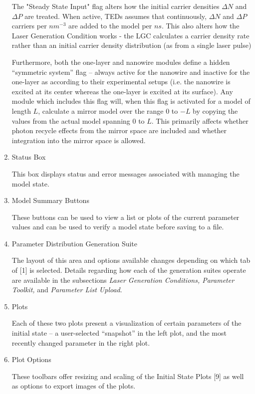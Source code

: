 \documentclass[11pt,letterpaper,titlepage]{article}
\begin{document}
\begin{enumerate}
				\par The "Steady State Input" flag alters how the initial carrier densities $\Delta N$ and $\Delta P$ are treated. When active, TEDs assumes that continuously, $\Delta N$ and $\Delta P$ carriers per $ nm^{-3}$ are added to the model per $ ns $. This also alters how the Laser Generation Condition works - the LGC calculates a carrier density rate rather than an initial carrier density distribution (as from a single laser pulse)
				
				\par Furthermore, both the one-layer and nanowire modules define a hidden “symmetric system” flag – always active for the nanowire and inactive for the one-layer as according to their experimental setups (i.e. the nanowire is excited at its center whereas the one-layer is excited at its surface). Any module which includes this flag will, when this flag is activated for a model of length $L$, calculate a mirror model over the range 0 to $-L$ by copying the values from the actual model spanning 0 to $L$. This primarily affects whether photon recycle effects from the mirror space are included and whether integration into the mirror space is allowed.
				
				\item Status Box
				\par
				This box displays status and error messages associated with managing the model state.
				
				\item Model Summary Buttons
				\par These buttons can be used to view a list or plots of the current parameter values and can be used to verify a model state before saving to a file.
				
				\item Parameter Distribution Generation Suite
				\par The layout of this area and options available changes depending on which tab of [1] is selected. Details regarding how each of the generation suites operate are available in the subsections \textit{Laser Generation Conditions, Parameter Toolkit,} and \textit{Parameter List Upload}.
				
				\item Plots
				\par Each of these two plots present a visualization of certain parameters of the initial state – a user-selected “snapshot” in the left plot, and the most recently changed parameter in the right plot.
				
				\item Plot Options
				\par These toolbars offer resizing and scaling of the Initial State Plots [9] as well as options to export images of the plots.
				
			\end{enumerate}
		
\end{document}
